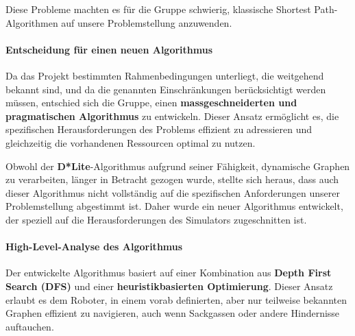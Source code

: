 \documentclass[main.tex]{subfiles} %
\begin{document}
Diese Probleme machten es für die Gruppe schwierig, klassische
Shortest Path-Algorithmen auf unsere Problemstellung anzuwenden.

\paragraph{Entscheidung für einen neuen Algorithmus}

Da das Projekt bestimmten Rahmenbedingungen unterliegt, die
weitgehend bekannt sind, und da die genannten Einschränkungen
berücksichtigt werden müssen, entschied sich die Gruppe, einen
\textbf{massgeschneiderten und pragmatischen Algorithmus} zu
entwickeln. Dieser Ansatz ermöglicht es, die spezifischen
Herausforderungen des Problems effizient zu adressieren und
gleichzeitig die vorhandenen Ressourcen optimal zu nutzen.

Obwohl der \textbf{D*Lite}-Algorithmus aufgrund seiner Fähigkeit,
dynamische Graphen zu verarbeiten, länger in Betracht gezogen wurde,
stellte sich heraus, dass auch dieser Algorithmus nicht vollständig
auf die spezifischen Anforderungen unserer Problemstellung abgestimmt
ist. Daher wurde ein neuer Algorithmus entwickelt, der speziell auf
die Herausforderungen des Simulators zugeschnitten ist.

\paragraph{High-Level-Analyse des Algorithmus}

Der entwickelte Algorithmus basiert auf einer Kombination aus
\textbf{Depth First Search (DFS)} und einer
\textbf{heuristikbasierten Optimierung}. Dieser Ansatz erlaubt es dem
Roboter, in einem vorab definierten, aber nur teilweise bekannten
Graphen effizient zu navigieren, auch wenn Sackgassen oder andere
Hindernisse auftauchen.
\end{document}
